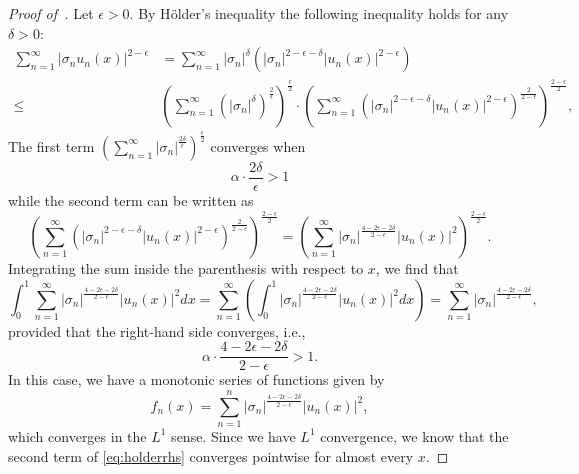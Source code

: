 \documentclass{article}
\begin{document}
\begin{proof}[Proof of~]
Let $\epsilon>0$. By H{\"o}lder's inequality the following inequality holds for any $\delta>0$: 
\begin{align}\nonumber
    \sum_{n=1}^\infty |\sigma_n u_n(x)|^{2-\epsilon} &= \sum_{n=1}^\infty|\sigma_n|^\delta\left(|\sigma_n|^{2-\epsilon-\delta}|u_n(x)|^{2-\epsilon}\right)\\ \label{eq:holderrhs}
    \leq &\left(\sum_{n=1}^\infty\left(|\sigma_n|^\delta\right)^\frac{2}{\epsilon}\right)^\frac{\epsilon}{2} \cdot \left(\sum_{n=1}^{\infty}\left(|\sigma_n|^{2-\epsilon-\delta}|u_n(x)|^{2-\epsilon}\right)^\frac{2}{2-\epsilon}\right)^\frac{2-\epsilon}{2},
\end{align}
The first term $(\sum_{n=1}^\infty |\sigma_n|^\frac{2\delta}{\epsilon})^\frac{\epsilon}{2}$ 
converges when 
\begin{equation}\label{eq:firstassumption}
    \alpha \cdot \frac{2\delta}{\epsilon} > 1
\end{equation}
while the second term can be written as
\begin{equation*}
    \left(\sum_{n=1}^{\infty}\left(|\sigma_n|^{2-\epsilon-\delta}|u_n(x)|^{2-\epsilon}\right)^\frac{2}{2-\epsilon}\right)^\frac{2-\epsilon}{2}= \left(\sum_{n=1}^\infty |\sigma_n|^\frac{4-2\epsilon-2\delta}{2-\epsilon}|u_n(x)|^2\right)^\frac{2-\epsilon}{2}.
\end{equation*}
Integrating the sum inside the parenthesis with respect to $x$, we find that 
\begin{equation*}
    \int_0^1\sum_{n=1}^\infty |\sigma_n|^\frac{4-2\epsilon-2\delta}{2-\epsilon}|u_n(x)|^2dx = \sum_{n=1}^\infty \left(\int_0^1|\sigma_n|^\frac{4-2\epsilon-2\delta}{2-\epsilon}|u_n(x)|^2 dx \right) = \sum_{n=1}^\infty|\sigma_n|^\frac{4-2\epsilon-2\delta}{2-\epsilon},
\end{equation*}
provided that the right-hand side converges, i.e., 
\begin{equation}\label{eq:secondassumption}
    \alpha\cdot \frac{4-2\epsilon-2\delta}{2-\epsilon} > 1.
\end{equation}
In this case, we have a monotonic series of functions given by  
\begin{equation*}
    f_n(x) = \sum_{n=1}^n |\sigma_n|^\frac{4-2\epsilon-2\delta}{2-\epsilon}|u_n(x)|^2,
\end{equation*}
which converges in the $L^1$ sense. Since we have $L^1$ convergence, we know that the second term of \cref{eq:holderrhs} converges pointwise for almost every $x$. 


\end{proof}
\end{document}
